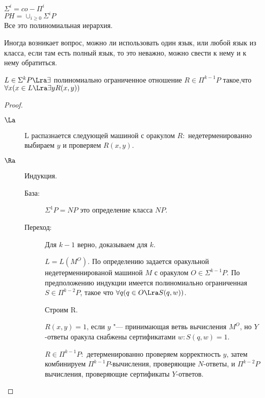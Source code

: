 $\Sigma^{i} = co-\Pi^{i}$\\

$PH = \cup_{i \ge 0}\Sigma^{i}P$ \\

Все это полиномиальная иерархия. 

Иногда возникает вопрос, можно ли использовать один язык, или 
любой язык из класса, если там есть полный язык, то это неважно, 
можно свести к нему и к нему обратиться. 

\begin{theorem}
$L \in \Sigma^{k}P \Lra \exists$ полиномиально ограниченное отношение 
$R \in \Pi^{k - 1}P$ такое,что $\forall x (x \in L \Lra \exists y R(x, y))$
\end{theorem}
\begin{proof}
\begin{description}
\item[$\La$] L распазнается следующей машиной с оракулом $R:$
недетерменированно выбираем $y$ и проверяем $R(x, y)$.
\item[$\Ra$] Индукция. 
    \begin{description}
    \item[База:]
    $\Sigma^1 P = NP$ это определение класса $NP$.
    \item[Переход:] 
    Для $k - 1$ верно, доказываем для $k$.
    
    $L = L(M^O)$.
    По определению задается оракульной недетерменнированой 
    машиной $M$ с оракулом $O \in \Sigma^{k - 1}P$. По
    предположению индукции имеется полиномиально
    ограниченная $S \in \Pi^{k - 2}P$, такое что
    $\forall q(q \in O \Lra S(q, w))$.

    Строим R.

   $R(x, y) = 1$, если $y$ "--- принимающая ветвь вычисления
   $M^O$, но $Y$-ответы оракула снабжены сертификатами
   $w\colon S(q, w) = 1$.

  $R \in \Pi^{k - 1}P:$ детерменированно проверяем
  корректность $y$, затем комбинируем $\Pi^{k - 1}P$-вычисления,
  проверяющие $N$-ответы, и $\Pi^{k - 2}P$ вычисления, проверяющие
  сертификаты $Y$-ответов.  
    \end{description}
\end{description}
\end{proof}             

